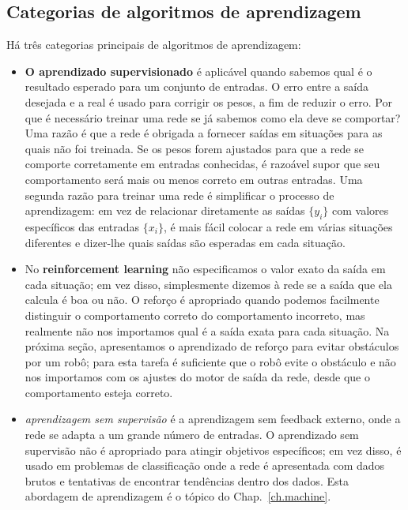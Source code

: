 \subsection{Categorias de algoritmos de aprendizagem}

Há três categorias principais de algoritmos de aprendizagem:

\begin{itemize}
\item \textbf{O aprendizado supervisionado} é aplicável quando sabemos qual é o resultado esperado para um conjunto de entradas. O erro entre a saída desejada e a real é usado para corrigir os pesos, a fim de reduzir o erro. Por que é necessário treinar uma rede se já sabemos como ela deve se comportar? Uma razão é que a rede é obrigada a fornecer saídas em situações para as quais não foi treinada. Se os pesos forem ajustados para que a rede se comporte corretamente em entradas conhecidas, é razoável supor que seu comportamento será mais ou menos correto em outras entradas. Uma segunda razão para treinar uma rede é simplificar o processo de aprendizagem: em vez de relacionar diretamente as saídas $\{y_i\}$ com valores específicos das entradas $\{x_i\}$, é mais fácil colocar a rede em várias situações diferentes e dizer-lhe quais saídas são esperadas em cada situação.

\item No \textbf{reinforcement learning} não especificamos o valor exato da saída em cada situação; em vez disso, simplesmente dizemos à rede se a saída que ela calcula é boa ou não. O reforço é apropriado quando podemos facilmente distinguir o comportamento correto do comportamento incorreto, mas realmente não nos importamos qual é a saída exata para cada situação. Na próxima seção, apresentamos o aprendizado de reforço para evitar obstáculos por um robô; para esta tarefa é suficiente que o robô evite o obstáculo e não nos importamos com os ajustes do motor de saída da rede, desde que o comportamento esteja correto.

\item \emph{aprendizagem sem supervisão} é a aprendizagem sem feedback externo, onde a rede se adapta a um grande número de entradas. O aprendizado sem supervisão não é apropriado para atingir objetivos específicos; em vez disso, é usado em problemas de classificação onde a rede é apresentada com dados brutos e tentativas de encontrar tendências dentro dos dados. Esta abordagem de aprendizagem é o tópico do Chap.~\ref{ch.machine}.
\end{itemize}

